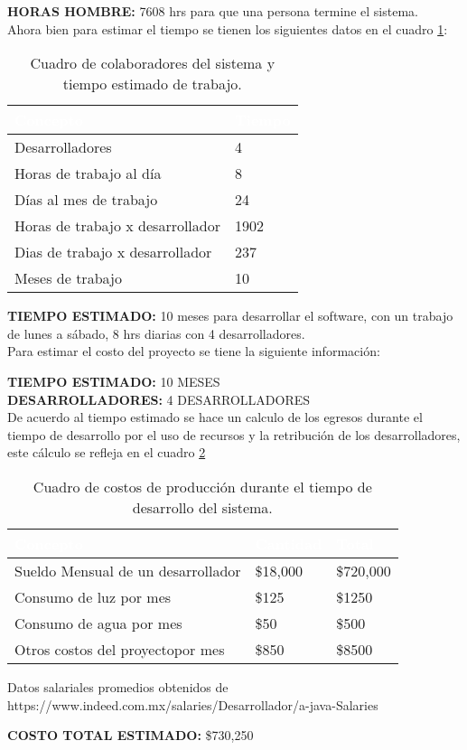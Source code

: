 \textbf {HORAS HOMBRE:} 7608 hrs para que una persona termine el sistema.\\


Ahora bien para estimar el tiempo se tienen los siguientes datos en el cuadro \ref{tbl:colab}:

\begin{table}[H]
	\centering
	\begin{tabular}{|p{4cm}|p{4cm}|}
		\hline
		\rowcolor{black} \textcolor{white} {\textbf{Concepto}} & \textcolor{white}{\textbf{Tiempo}} \\ \hline
		Desarrolladores & 4  \\
		\hline
		Horas de trabajo al día & 8  \\
		\hline
		Días al mes de trabajo & 24  \\
		\hline
		Horas de trabajo x desarrollador & 1902  \\
		\hline
		Dias de trabajo x desarrollador & 237  \\
		\hline
		Meses de trabajo  & 10  \\
		\hline
	\end{tabular}
\caption{Cuadro de colaboradores del sistema y tiempo estimado de trabajo.}
\label{tbl:colab}
\end{table}

\textbf {TIEMPO ESTIMADO:} 10 meses para desarrollar el software, con un trabajo de lunes a sábado, 8 hrs diarias con 4 desarrolladores.\\

Para estimar el costo del proyecto se tiene la siguiente información:

\textbf {TIEMPO ESTIMADO:} 10 MESES \\
\textbf {DESARROLLADORES:} 4 DESARROLLADORES\\

De acuerdo al tiempo estimado se hace un calculo de los egresos durante el tiempo de desarrollo por el uso de recursos y la retribución de los desarrolladores,  este cálculo se refleja en el cuadro \ref{tbl:egresos}

\begin{table}[H]
	\centering
	\begin{tabular}{|p{4cm}|p{4cm}|p{4cm}|}
		\hline
		\rowcolor{black} \textcolor{white} {\textbf{Concepto}} & \textcolor{white}{\textbf{Cantidad}} & \textcolor{white}{\textbf{Total}} \\ \hline
		Sueldo Mensual de un desarrollador & \$18,000 & \$720,000   \\
		\hline
		Consumo de luz por mes & \$125  & \$1250 \\
		\hline
		Consumo de agua por mes & \$50  & \$500  \\
		\hline
		Otros costos del proyectopor mes & \$850  & \$8500  \\
		\hline
	\end{tabular}
\caption{Cuadro de costos de producción durante el tiempo de desarrollo del sistema.}
\label{tbl:egresos}
\end{table}

Datos salariales promedios obtenidos de https://www.indeed.com.mx/salaries/Desarrollador/a-java-Salaries

\textbf {COSTO TOTAL ESTIMADO:} \$730,250  \\

